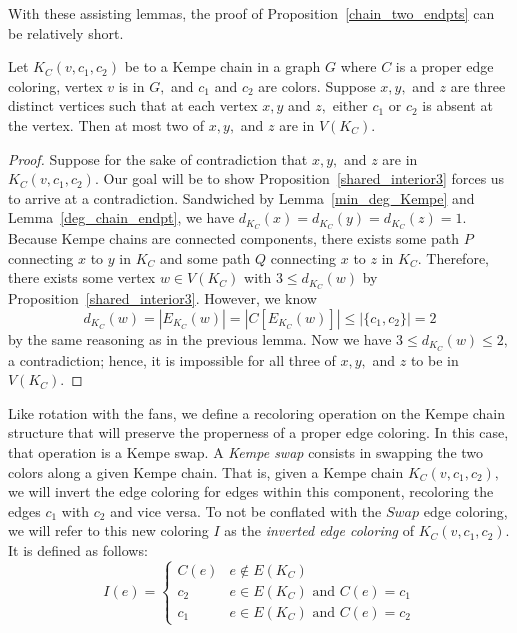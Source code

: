 With these assisting lemmas, the proof of Proposition~\ref{chain_two_endpts} can be relatively short. 
\begin{prop}\label{chain_two_endpts}
   Let $K_C(v,c_1,c_2)$ be to a Kempe chain in a graph $G$ where $C$ is a proper edge coloring, vertex $v$ is in $G,$ and $c_1$ and $c_2$ are colors. Suppose $x, y,$ and $z$ are three distinct vertices such that at each vertex $x, y$ and $z,$ either $c_1$ or $c_2$ is absent at the vertex. Then at most two of $x, y,$ and $z$ are in $V(K_C).$
\end{prop}
\begin{proof}
Suppose for the sake of contradiction that $x,y,$ and $z$ are in $K_C(v, c_1, c_2).$ Our goal will be to show Proposition~\ref{shared_interior3} forces us to arrive at a contradiction. Sandwiched by Lemma~\ref{min_deg_Kempe} and Lemma~\ref{deg_chain_endpt}, we have $d_{K_C}(x) = d_{K_C}(y) = d_{K_C}(z) = 1.$ Because Kempe chains are connected components, there exists some path $P$ connecting $x$ to $y$ in $K_C$ and some path $Q$ connecting $x$ to $z$ in $K_C.$ Therefore, there exists some vertex $w \in V(K_C)$ with $3 \leq d_{K_C}(w)$ by Proposition~\ref{shared_interior3}. However, we know $$d_{K_C}(w) = |E_{K_C}(w)| = |C[E_{K_C}(w)]| \leq |\{c_1, c_2\}| = 2$$ by the same reasoning as in the previous lemma. Now we have $3 \leq d_{K_C}(w) \leq 2,$ a contradiction; hence, it is impossible for all three of $x, y,$ and $z$ to be in $V(K_C).$
\end{proof}

Like rotation with the fans, we define a recoloring operation on the Kempe chain structure that will preserve the properness of a proper edge coloring. In this case, that operation is a Kempe swap. A \textit{Kempe swap} consists in swapping the two colors along a given Kempe chain. That is, given a Kempe chain $K_C(v, c_1, c_2),$ we will invert the edge coloring for edges within this component, recoloring the edges $c_1$ with $c_2$ and vice versa. To not be conflated with the $Swap$ edge coloring, we will refer to this new coloring $I$ as the \textit{inverted edge coloring} of $K_C(v, c_1, c_2).$ It is defined as follows:
\begin{equation*}
    I(e) = \begin{cases}
        C(e) & e \notin E(K_C) \\
        c_2 & e \in E(K_C) \text{ and } C(e) = c_1 \\
        c_1 & e \in E(K_C) \text{ and } C(e) = c_2
    \end{cases}
\end{equation*}

